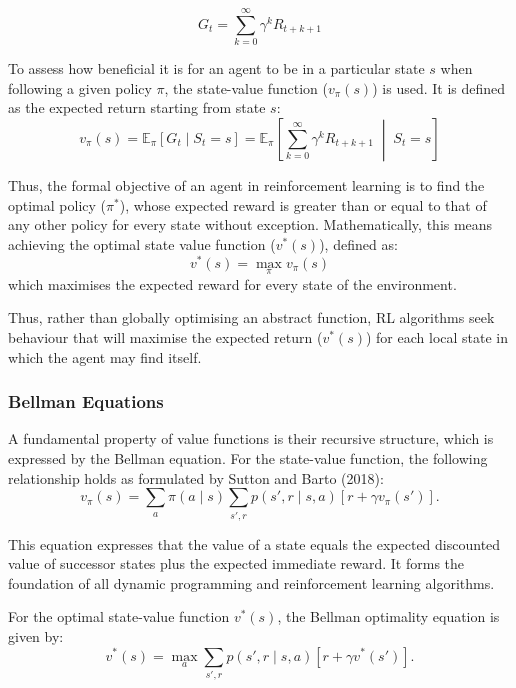 \begin{equation}
G_t = \sum_{k=0}^{\infty} \gamma^k R_{t+k+1}
\label{eq:return}
\end{equation}

To assess how beneficial it is for an agent to be in a particular state $s$ when following a given policy $\pi$, the state-value function ($v_{\pi}(s)$) is used. It is defined as the expected return starting from state $s$:
\begin{equation}
v_{\pi}(s)
=
\mathbb{E}_{\pi}\!\left[G_t \mid S_t = s\right]
=
\mathbb{E}_{\pi}\!\left[
\sum_{k=0}^{\infty}
\gamma^k R_{t+k+1}
\;\middle|\;
S_t = s
\right]
\end{equation}


Thus, the formal objective of an agent in reinforcement learning is to find the optimal policy ($\pi^{*}$), whose expected reward is greater than or equal to that of any other policy for every state without exception. Mathematically, this means achieving the optimal state value function ($v^{*}(s)$), defined as:
\begin{equation}
v^{*}(s) = \max_{\pi} v_{\pi}(s)
\end{equation}
which maximises the expected reward for every state of the environment.

Thus, rather than globally optimising an abstract function, RL algorithms seek behaviour that will maximise the expected return ($v^{*}(s)$) for each local state in which the agent may find itself.


\subsubsection{Bellman Equations}

A fundamental property of value functions is their recursive structure, which is expressed by the Bellman equation. For the state-value function, the following relationship holds as formulated by Sutton and Barto (2018):
\[
v_\pi(s) = \sum_{a} \pi(a \mid s) \sum_{s', r} p(s', r \mid s, a) \left[r + \gamma v_\pi(s')\right].
\]

This equation expresses that the value of a state equals the expected discounted value of successor states plus the expected immediate reward. It forms the foundation of all dynamic programming and reinforcement learning algorithms.

For the optimal state-value function \(v^*(s)\), the Bellman optimality equation is given by:
\[
v^*(s) = \max_{a} \sum_{s', r} p(s', r \mid s, a) \left[r + \gamma v^*(s')\right].
\]

